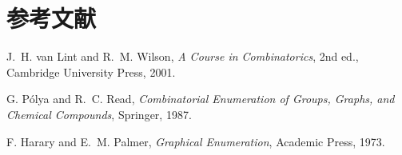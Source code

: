 \documentclass[a5paper,10pt,onecolumn]{jsarticle}
\theoremstyle{mathnotetheorem}
\begin{document}
\section*{参考文献}
\begin{enumerate}[label={[\arabic*]},leftmargin=3.3zw]
\item J.~H. van Lint and R.~M. Wilson, \textit{A Course in Combinatorics}, 2nd ed., Cambridge University Press, 2001.
\item G. P\'olya and R.~C. Read, \textit{Combinatorial Enumeration of Groups, Graphs, and Chemical Compounds}, Springer, 1987.
\item F. Harary and E.~M. Palmer, \textit{Graphical Enumeration}, Academic Press, 1973.
\end{enumerate}
\end{document}
